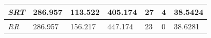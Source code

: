 \documentclass{article}
\begin{document}
\begin{table}[h!]
\begin{tabular}{|l|l|l|l|l|l|l|}
  \textit{SRT}       & 286.957                                                                          & 113.522                                                                     & 405.174                                                                            & 27                                                                                    & 4                                                                                   & 38.5424                                                                    \\ \hline
  \textit{RR}        & 286.957                                                                          & 156.217                                                                     & 447.174                                                                            & 23                                                                                    & 0                                                                                   & 38.6281                                                                    \\ \hline
  \end{tabular}
\end{table}
\end{document}
